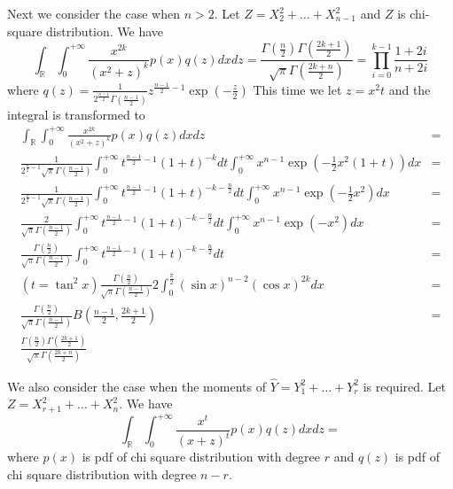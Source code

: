 \documentclass{article}
\def\R{\mathbb{R}}
\begin{document}
Next we consider the case when $n>2$. Let $Z = X_2^2 + \dots + X_{n-1}^2$ and $Z$ is chi-square distribution. We have
\begin{equation}\label{eq:n3}
\int_{\R}\int_{0}^{+\infty} \frac{x^{2k}}{(x^2+z)^k} p(x)q(z)dxdz = \frac{\Gamma(\frac{n}{2}) \Gamma(\frac{2k+1}{2})}{\sqrt{\pi} \Gamma(\frac{2k+n}{2})} = \prod_{i=0}^{k-1} \frac{1+2i}{n+2i}
\end{equation}
where $q(z) = \frac{1}{2^{\frac{n-1}{2}}\Gamma(\frac{n-1}{2})} z ^{\frac{n-1}{2} - 1} \exp(-\frac{z}{2})$
This time we let $z=x^2 t$ and the integral is transformed to 
\begin{align*}
\int_{\R}\int_{0}^{+\infty} \frac{x^{2k}}{(x^2+z)^k} p(x)q(z)dxdz & = \\
\frac{1}{2^{\frac{n}{2}-1}\sqrt{\pi}\Gamma(\frac{n-1}{2})} \int_{0}^{+\infty}t^{\frac{n-1}{2}-1}(1+t)^{-k}dt\int_{0}^{+\infty}x^{n-1} \exp(-\frac{1}{2}x^2(1+t)) dx &=
\\
\frac{1}{2^{\frac{n}{2}-1}\sqrt{\pi}\Gamma(\frac{n-1}{2})} \int_{0}^{+\infty}t^{\frac{n-1}{2}-1}(1+t)^{-k-\frac{n}{2}}dt\int_{0}^{+\infty}x^{n-1} \exp(-\frac{1}{2}x^2) dx &=
\\
\frac{2}{\sqrt{\pi}\Gamma(\frac{n-1}{2})} \int_{0}^{+\infty}t^{\frac{n-1}{2}-1}(1+t)^{-k-\frac{n}{2}}dt\int_{0}^{+\infty}x^{n-1} \exp(-x^2) dx &=
\\
\frac{\Gamma(\frac{n}{2})}{\sqrt{\pi}\Gamma(\frac{n-1}{2})} \int_{0}^{+\infty}t^{\frac{n-1}{2}-1}(1+t)^{-k-\frac{n}{2}}dt
&= \\ (t=\tan^2 x) \frac{\Gamma(\frac{n}{2})}{\sqrt{\pi}\Gamma(\frac{n-1}{2})} 2 \int_0^{\frac{\pi}{2}} (\sin x)^{n-2} (\cos x)^{2k} dx 
&= \\ \frac{\Gamma(\frac{n}{2})}{\sqrt{\pi}\Gamma(\frac{n-1}{2})} B(\frac{n-1}{2}, \frac{2k+1}{2})
&= \\ \frac{\Gamma(\frac{n}{2}) \Gamma(\frac{2k+1}{2})}{\sqrt{\pi} \Gamma(\frac{2k+n}{2})}
\end{align*}

We also consider the case when the moments of $\hat{Y} = Y_1^2 + \dots + Y_r^2$ is required. Let $Z = X_{r+1}^2 + \dots + X_n^2$. We have 
\begin{equation}\label{eq:n4}
\int_{\R}\int_{0}^{+\infty} \frac{x^t}{(x+z)^t} p(x)q(z) dxdz = 
\end{equation}
where $p(x)$ is pdf of chi square distribution with degree $r$ and $q(z)$ is pdf of chi square distribution with degree $n-r$.
\end{document}
